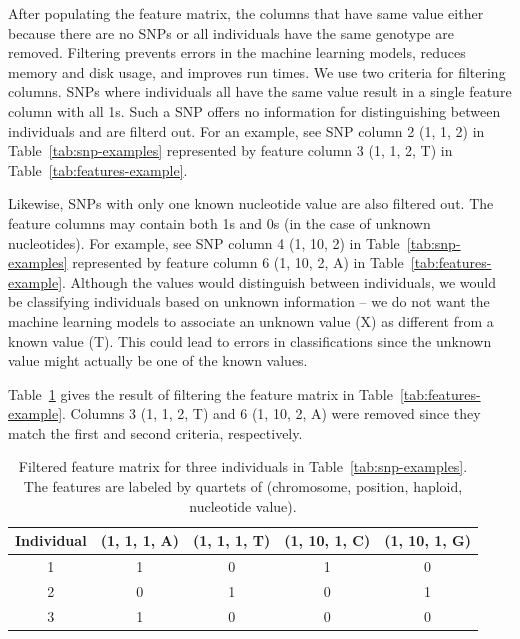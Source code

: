 After populating the feature matrix, the columns that have same value either because there are no SNPs or all individuals have the same genotype are removed.  Filtering prevents errors in the machine learning models, reduces memory and disk usage, and improves run times.  We use two criteria for filtering columns. SNPs where individuals all have the same value result in a single feature column with all 1s.  Such a SNP offers no information for distinguishing between individuals and are filterd out.  For an example, see SNP column 2 (1, 1, 2) in Table~\ref{tab:snp-examples} represented by feature column 3 (1, 1, 2, T) in Table~\ref{tab:features-example}.

Likewise, SNPs with only one known nucleotide value are also filtered out. The feature columns may contain both 1s and 0s (in the case of unknown nucleotides).  For example, see SNP column 4 (1, 10, 2) in Table~\ref{tab:snp-examples} represented by feature column 6 (1, 10, 2, A) in Table~\ref{tab:features-example}.  Although the values would distinguish between individuals, we would be classifying individuals based on unknown information -- we do not want the machine learning models to associate an unknown value (X) as different from a known value (T).  This could lead to errors in classifications since the unknown value might actually be one of the known values.

Table~\ref{tab:filtered-features-example} gives the result of filtering the feature matrix in Table~\ref{tab:features-example}. Columns 3 (1, 1, 2, T) and 6 (1, 10, 2, A) were removed since they match the first and second criteria, respectively.

\begin{table}[h!]
  \begin{center}
    \begin{tabular}{ c c c c c }
      \hline
      \textbf{Individual} & \textbf{(1, 1, 1, A)} & \textbf{(1, 1, 1, T)} & \textbf{(1, 10, 1, C)} & \textbf{(1, 10, 1, G)} \\ \hline
      1 & 1 & 0 & 1 & 0 \\
      2 & 0 & 1 & 0 & 1 \\
      3 & 1 & 0 & 0 & 0 \\
    \end{tabular}
  \end{center}
  \caption{Filtered feature matrix for three individuals in Table~\ref{tab:snp-examples}.  The features are labeled by quartets of (chromosome, position, haploid, nucleotide value).}
  \label{tab:filtered-features-example}
\end{table}

